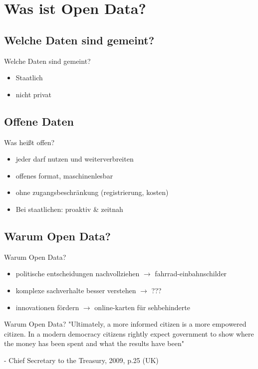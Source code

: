 \section{Was ist Open Data?}

\subsection{Welche Daten sind gemeint?}

\begin{frame}[t]{Welche Daten sind gemeint?}
\begin{itemize}
 \item Staatlich
 \item nicht privat
\end{itemize}
\end{frame}

\subsection{Offene Daten}
\begin{frame}[t]{Was heißt offen?}
 \begin{itemize}
   \item jeder darf nutzen und weiterverbreiten
   \item offenes format, maschinenlesbar
   \item ohne zugangsbeschränkung (registrierung, kosten)
   \item Bei staatlichen: proaktiv \& zeitnah
 \end{itemize}
\end{frame}

\subsection{Warum Open Data?}
\begin{frame}[t]{Warum Open Data?}
 \begin{itemize}
  \item politische entscheidungen nachvollziehen $\rightarrow$ fahrrad-einbahnschilder
  \item komplexe sachverhalte besser verstehen $\rightarrow$ ???
  \item innovationen fördern $\rightarrow$ online-karten für sehbehinderte
 \end{itemize}
\end{frame}

\begin{frame}{Warum Open Data?}
 "Ultimately, a more informed citizen is a more empowered citizen. In a modern democracy citizens rightly expect government to show where the money has been spent and what the results have been"
 
 - Chief Secretary to the Treasury, 2009, p.25 (UK)
\end{frame}